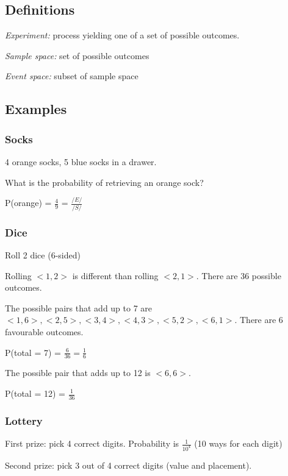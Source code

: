 \documentclass[english,openany]{book}
\begin{document}
    \subsection{Definitions}

    \textit{Experiment:} process yielding one of a set of possible outcomes.

    \textit{Sample space:} set of possible outcomes

    \textit{Event space:} subset of sample space

    \subsection{Examples}

    \subsubsection{Socks}

    4 orange socks, 5 blue socks in a drawer.

    What is the probability of retrieving an orange sock?

    P(orange) = $\frac{4}{9}$ = $\frac{/E/}{/S/}$\\

    \subsubsection{Dice}

    Roll 2 dice (6-sided)

    Rolling $<1,2>$ is different than rolling $<2,1>$. There are 36 possible outcomes.

    The possible pairs that add up to 7 are $<1,6>, <2,5>, <3,4>, <4,3>, <5,2>, <6,1>$. There are 6 favourable outcomes.

    P(total = 7) = $\frac{6}{36} = \frac{1}{6}$

    The possible pair that adds up to 12 is $<6,6>$.

    P(total = 12) = $\frac{1}{36}$\\

    \subsubsection{Lottery}

    First prize: pick 4 correct digits. Probability is $\frac{1}{10^4}$ (10 ways for each digit)

    Second prize: pick 3 out of 4 correct digits (value and placement).
\end{document}
